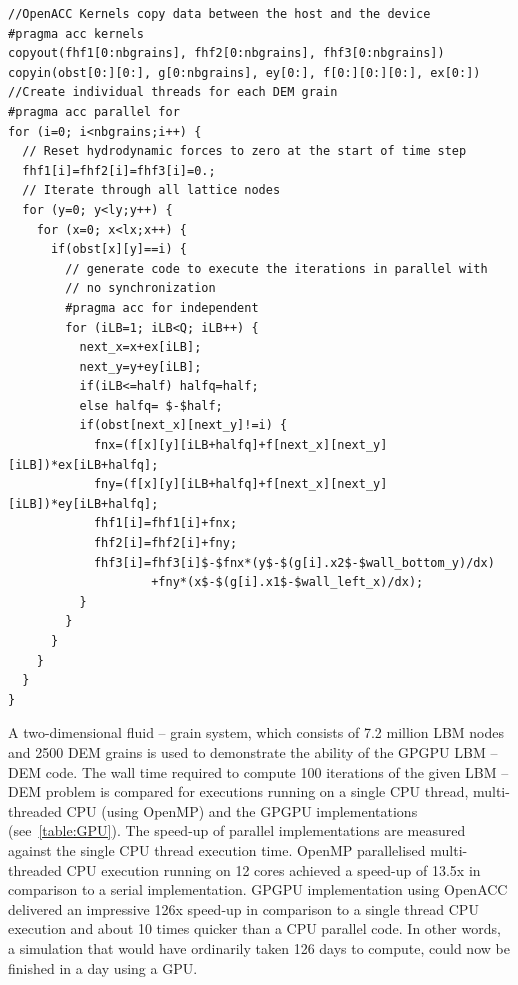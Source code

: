 \begin{lstlisting}[label=lst:GPU,caption= OpenACC GPU implementation of the 
hydrodynamic force computation.,style=customcpp]
//OpenACC Kernels copy data between the host and the device
#pragma acc kernels 
copyout(fhf1[0:nbgrains], fhf2[0:nbgrains], fhf3[0:nbgrains]) 
copyin(obst[0:][0:], g[0:nbgrains], ey[0:], f[0:][0:][0:], ex[0:])
//Create individual threads for each DEM grain
#pragma acc parallel for
for (i=0; i<nbgrains;i++) {
  // Reset hydrodynamic forces to zero at the start of time step
  fhf1[i]=fhf2[i]=fhf3[i]=0.;
  // Iterate through all lattice nodes
  for (y=0; y<ly;y++) {
    for (x=0; x<lx;x++) {
      if(obst[x][y]==i) {
        // generate code to execute the iterations in parallel with
        // no synchronization
        #pragma acc for independent
        for (iLB=1; iLB<Q; iLB++) {
          next_x=x+ex[iLB];
          next_y=y+ey[iLB];
          if(iLB<=half) halfq=half;
          else halfq= $-$half;
          if(obst[next_x][next_y]!=i) {
            fnx=(f[x][y][iLB+halfq]+f[next_x][next_y][iLB])*ex[iLB+halfq];
            fny=(f[x][y][iLB+halfq]+f[next_x][next_y][iLB])*ey[iLB+halfq];
            fhf1[i]=fhf1[i]+fnx;
            fhf2[i]=fhf2[i]+fny;
            fhf3[i]=fhf3[i]$-$fnx*(y$-$(g[i].x2$-$wall_bottom_y)/dx) 
                    +fny*(x$-$(g[i].x1$-$wall_left_x)/dx);
          }			
        }
      }
    }
  }
}
\end{lstlisting}

A two-dimensional fluid -- grain system, which consists of 7.2 million LBM 
nodes and 2500 DEM grains is used to demonstrate the ability of the GPGPU LBM 
-- DEM code. The wall time required to compute 100 iterations of the given LBM 
-- DEM  problem is compared for executions running on a single CPU thread, 
multi-threaded CPU (using OpenMP) and the GPGPU implementations 
(see~\cref{table:GPU}). The speed-up of parallel implementations are measured 
against the single CPU thread execution time. OpenMP parallelised 
multi-threaded CPU execution running on 12 cores achieved a speed-up of 13.5x 
in comparison to a serial implementation. GPGPU implementation using OpenACC 
delivered an impressive 126x speed-up in comparison to a single thread CPU 
execution and about 10 times quicker than a CPU parallel code. In other words, 
a simulation that would have ordinarily taken 126 days to compute, could now be 
finished in a day using a GPU.






